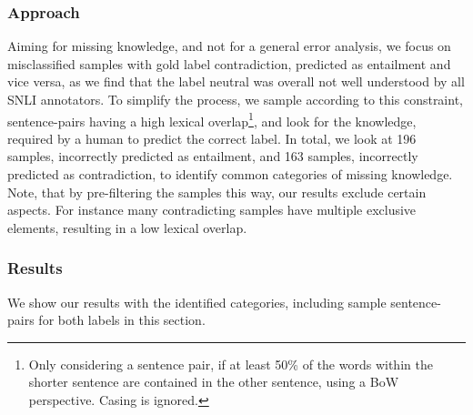 \subsubsection{Approach}
Aiming for missing knowledge, and not for a general error analysis, we focus on misclassified samples with gold label contradiction, predicted as entailment and vice versa, as we find that the label neutral was overall not well understood by all \ac{SNLI} annotators. To simplify the process, we sample according to this constraint, sentence-pairs having a high lexical overlap\footnote{Only considering a sentence pair, if at least 50\% of the words within the shorter sentence are contained in the other sentence, using a \ac{BoW} perspective. Casing is ignored.}, and look for the knowledge, required by a human to predict the correct label. In total, we look at 196 samples, incorrectly predicted as entailment, and 163 samples, incorrectly predicted as contradiction, to identify common categories of missing knowledge. Note, that by pre-filtering the samples this way, our results exclude certain aspects. For instance many contradicting samples have multiple exclusive elements, resulting in a low lexical overlap.
\subsubsection{Results}
We show our results with the identified categories, including sample sentence-pairs for both labels in this section.

